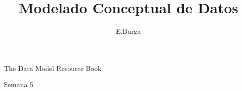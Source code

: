 \documentclass{Report}
\author{E.Burga}
\begin{document}
\title{Modelado Conceptual de Datos}
\maketitle

\begin{titlepage}
\begin{center}
\begin{huge}
    The Data Model Resource Book
\end{huge}
\end{center}
\end{titlepage}



\begin{titlepage}
    \begin{center}
    \begin{huge}
        Semana 5
    \end{huge}
    \end{center}
\end{titlepage}


    
\end{document}
